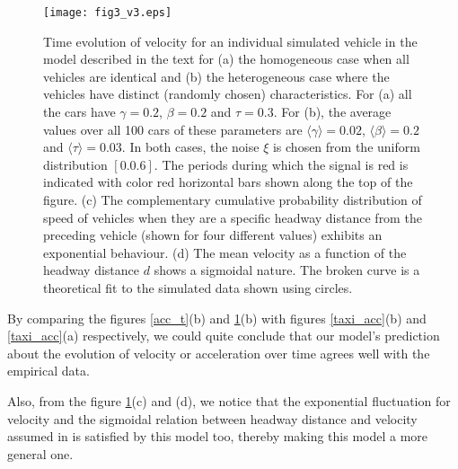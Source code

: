 \documentclass[conference]{IEEEtran}
\begin{document}
\begin{figure}
{    \texttt{[image: fig3\_v3.eps]}}
    \caption{Time evolution of velocity for an individual simulated vehicle in the model described in the text for (a) the homogeneous case when all vehicles are identical and (b) the heterogeneous case where the vehicles have distinct (randomly chosen) characteristics. For (a) all the cars have $\gamma=0.2$, $\beta=0.2$ and $\tau=0.3$. For (b), the average values over all 100 cars of these parameters are $\langle \gamma \rangle =0.02$, $\langle \beta \rangle =0.2$ and $\langle \tau \rangle =0.03$. In both cases, the noise $\xi$ is chosen from the uniform distribution $[0.0.6]$. The periods during which the signal is red is indicated with color red horizontal bars shown along the top of the figure. (c) The complementary cumulative probability distribution of speed of vehicles when they are a specific headway distance from the preceding vehicle (shown for four different values) exhibits an exponential behaviour. (d) The mean velocity as a function of the headway distance $d$ shows a sigmoidal nature. The broken curve is a theoretical fit to the simulated data shown using circles.}

    \label{vel_t}
\end{figure}

By comparing the figures \ref{acc_t}(b) and \ref{vel_t}(b) with figures \ref{taxi_acc}(b) and \ref{taxi_acc}(a) respectively, we could quite conclude that our model's prediction about the evolution of velocity or acceleration over time agrees well with the empirical data.

Also, from the figure \ref{vel_t}(c) and (d), we notice that the exponential fluctuation for velocity and the sigmoidal relation between headway distance and velocity assumed in \cite{Majith2016} is satisfied by this model too, thereby making this model a more general one.
\end{document}
